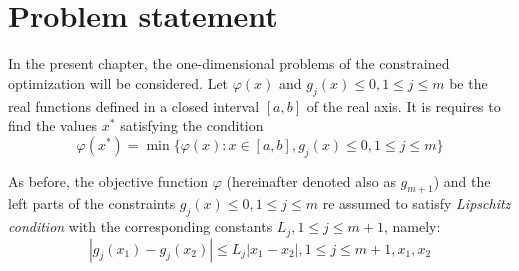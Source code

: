 
\section{Problem statement}
In the present chapter, the one-dimensional problems of the constrained optimization will
be considered. Let $\varphi(x)$ and $g_j(x)\le 0,1\le j\le m$ be the real functions defined in a closed interval $[a,b]$ of the real axis. It is requires to find the values $x^*$ satisfying the condition
\begin{equation}
  \label{eq4:problem}
  \varphi(x^*)=\min\{\varphi(x):x\in [a,b], g_j(x)\le 0,1\le j\le m\}
\end{equation}

As before, the objective function $\varphi$ (hereinafter denoted also as $g_{m+1}$) and the left parts of the constraints $g_j(x)\le 0,1\le j\le m$ re assumed to satisfy \emph{Lipschitz condition} with the corresponding constants $L_j,1\le j\le m+1$, namely:
\begin{equation}
  |g_j(x_1)-g_j(x_2)|\le L_j|x_1-x_2|,1\le j\le m+1,x_1,x_2
\end{equation}


